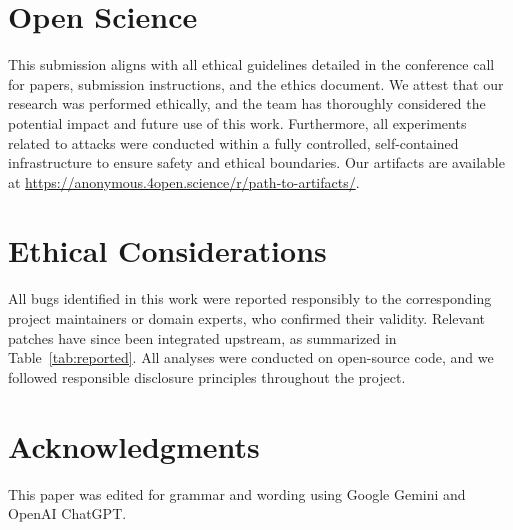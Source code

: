 
\section{Open Science}

This submission aligns with all ethical guidelines detailed in the conference call for papers, submission instructions, and the ethics document. We attest that our research was performed ethically, and the team has thoroughly considered the potential impact and future use of this work. Furthermore, all experiments related to attacks were conducted within a fully controlled, self-contained infrastructure to ensure safety and ethical boundaries.
%
Our artifacts are available at {\small \url{https://anonymous.4open.science/r/path-to-artifacts/}}.

\section{Ethical Considerations}

All bugs identified in this work were reported responsibly to the corresponding project maintainers or domain experts, who confirmed their validity. Relevant patches have since been integrated upstream, as summarized in Table~\ref{tab:reported}. All analyses were conducted on open-source code, and we followed responsible disclosure principles throughout the project.

\section{Acknowledgments}

This paper was edited for grammar and wording using Google Gemini and OpenAI ChatGPT. %
